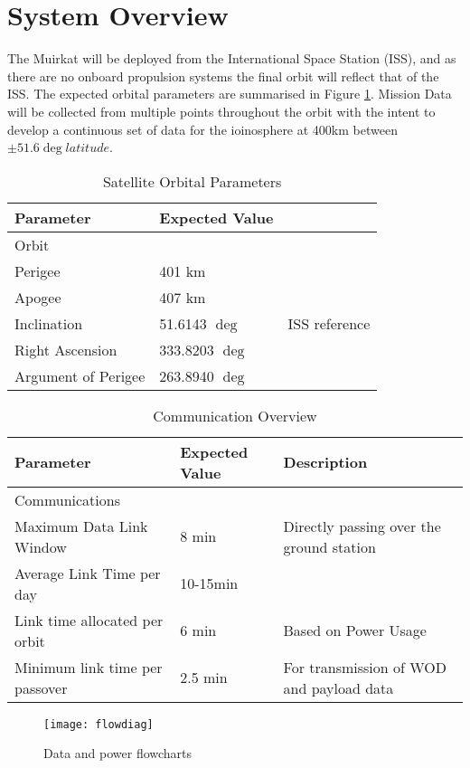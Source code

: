 \section{System Overview}
The Muirkat will be deployed from the International Space Station (ISS), and as there are no onboard propulsion systems the final orbit will reflect that of the ISS. The expected orbital parameters are summarised in Figure \ref{table_orbPara}. Mission Data will be collected from multiple points throughout the orbit with the intent to develop a continuous set of data for the ioinosphere at 400km between $\pm51.6\deg latitude$.
\begin{table}[h]
	\centering
		\label{table_orbPara}
		\begin{tabular}{ lll}
				\hline
				\textbf{Parameter} & \textbf{Expected Value} &                              		
				\\ \hline
				Orbit		& %
				\\ \hline
				Perigee & 401 km & 	\multirow{5}{*}{ISS reference}\\
				Apogee & 407 km & \\
				Inclination & 51.6143 $\deg$ & \\
				Right Ascension & 333.8203 $\deg$ & \\
				Argument of Perigee & 263.8940 $\deg$ & 
			\\ \hline
			\end{tabular}
		\caption{Satellite Orbital Parameters}
	\end{table}

\begin{table}[h]
		\centering
		\label{table_ComOver}
		\begin{tabular}{ lll}
				\hline
				\textbf{Parameter} & \textbf{Expected Value} & \textbf{Description}                                		
				\\ \hline
				Communications		& %
				\\ \hline
				Maximum Data Link Window & 8 min & Directly passing over the ground station\\
				Average Link Time per day & 10-15min &\\
				Link time allocated per orbit  & 6 min & Based on Power Usage\\
				Minimum link time per passover & 2.5 min & For transmission of WOD and payload data 
				\\ \hline
			\end{tabular}
		\caption{Communication Overview}
	\end{table}

\begin{figure}[H]
	\centering
	\texttt{[image: flowdiag]}
	\caption{Data and power flowcharts}
	\label{fig_flow}
\end{figure}
